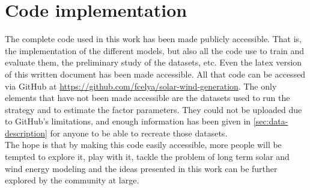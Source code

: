 \section{Code implementation}
\label{sec:code}
The complete code used in this work has been made publicly accessible. That is, the implementation of the different models, but also all the code use to train and evaluate them, the preliminary study of the datasets, etc. Even the latex version of this written document has been made accessible. All that code can be accessed via GitHub at \href{https://github.com/fcelya/solar-wind-generation}{https://github.com/fcelya/solar-wind-generation}. The only elements that have not been made accessible are the datasets used to run the strategy and to estimate the factor parameters. They could not be uploaded due to GitHub's limitations, and enough information has been given in \autoref{sec:data-description} for anyone to be able to recreate those datasets. \\ The hope is that by making this code easily accessible, more people will be tempted to explore it, play with it, tackle the problem of long term solar and wind energy modeling and the ideas presented in this work can be further explored by the community at large.